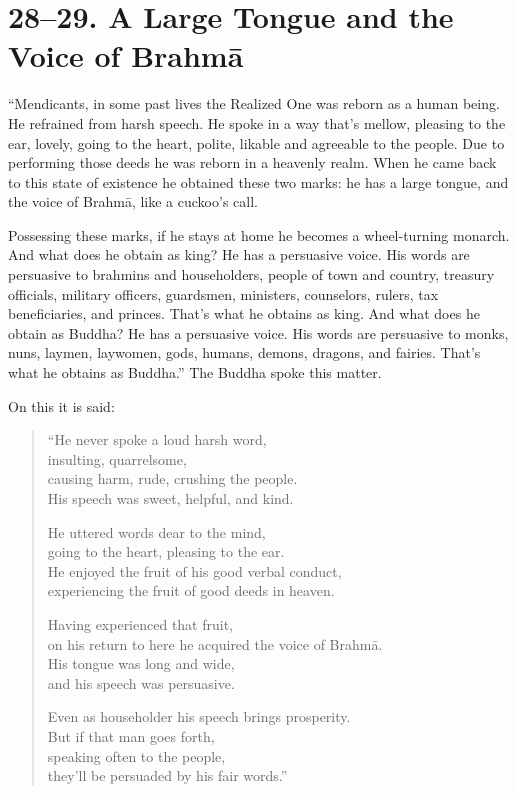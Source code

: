 \documentclass[12pt,openany]{book}%
\begin{document}
\section*{28–29. A Large Tongue and the Voice of \textsanskrit{Brahmā} }

“Mendicants, in some past lives the Realized One was reborn as a human being. He refrained from harsh speech. He spoke in a way that’s mellow, pleasing to the ear, lovely, going to the heart, polite, likable and agreeable to the people. Due to performing those deeds he was reborn in a heavenly realm. When he came back to this state of existence he obtained these two marks: he has a large tongue, and the voice of \textsanskrit{Brahmā}, like a cuckoo’s call. 

Possessing these marks, if he stays at home he becomes a wheel-turning monarch. And what does he obtain as king? He has a persuasive voice. His words are persuasive to brahmins and householders, people of town and country, treasury officials, military officers, guardsmen, ministers, counselors, rulers, tax beneficiaries, and princes. That’s what he obtains as king. And what does he obtain as Buddha? He has a persuasive voice. His words are persuasive to monks, nuns, laymen, laywomen, gods, humans, demons, dragons, and fairies. That’s what he obtains as Buddha.” The Buddha spoke this matter. 

On this it is said: 

\begin{verse}%
“He never spoke a loud harsh word, \\
insulting, quarrelsome, \\
causing harm, rude, crushing the people. \\
His speech was sweet, helpful, and kind. 

He uttered words dear to the mind, \\
going to the heart, pleasing to the ear. \\
He enjoyed the fruit of his good verbal conduct, \\
experiencing the fruit of good deeds in heaven. 

Having experienced that fruit, \\
on his return to here he acquired the voice of \textsanskrit{Brahmā}. \\
His tongue was long and wide, \\
and his speech was persuasive. 

Even as householder his speech brings prosperity. \\
But if that man goes forth, \\
speaking often to the people, \\
they’ll be persuaded by his fair words.” 

%
\end{verse}
\end{document}
